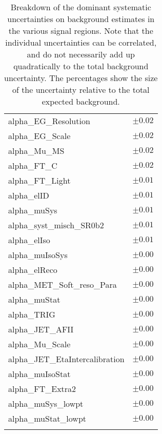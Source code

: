 \begin{table}
\begin{center}
\begin{tabular*}{\textwidth}{@{\extracolsep{\fill}}lc}
alpha\_EG\_Resolution         & $\pm 0.02$       \\
alpha\_EG\_Scale         & $\pm 0.02$       \\
alpha\_Mu\_MS         & $\pm 0.02$       \\
alpha\_FT\_C         & $\pm 0.02$       \\
alpha\_FT\_Light         & $\pm 0.01$       \\
alpha\_elID         & $\pm 0.01$       \\
alpha\_muSys         & $\pm 0.01$       \\
alpha\_syst\_misch\_SR0b2         & $\pm 0.01$       \\
alpha\_elIso         & $\pm 0.01$       \\
alpha\_muIsoSys         & $\pm 0.00$       \\
alpha\_elReco         & $\pm 0.00$       \\
alpha\_MET\_Soft\_reso\_Para         & $\pm 0.00$       \\
alpha\_muStat         & $\pm 0.00$       \\
alpha\_TRIG         & $\pm 0.00$       \\
alpha\_JET\_AFII         & $\pm 0.00$       \\
alpha\_Mu\_Scale         & $\pm 0.00$       \\
alpha\_JET\_EtaIntercalibration         & $\pm 0.00$       \\
alpha\_muIsoStat         & $\pm 0.00$       \\
alpha\_FT\_Extra2         & $\pm 0.00$       \\
alpha\_muSys\_lowpt         & $\pm 0.00$       \\
alpha\_muStat\_lowpt         & $\pm 0.00$       \\
\noalign{\smallskip}\hline\noalign{\smallskip}
\end{tabular*}
\end{center}
\caption[Breakdown of uncertainty on background estimates]{
Breakdown of the dominant systematic uncertainties on background estimates in the various signal regions.
Note that the individual uncertainties can be correlated, and do not necessarily add up quadratically to 
the total background uncertainty. The percentages show the size of the uncertainty relative to the total expected background.
\label{table.results.bkgestimate.uncertainties.SR0b2}}
\end{table}
%